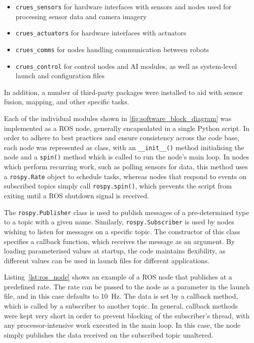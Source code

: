 \begin{itemize}
	\item \verb|crues_sensors| for hardware interfaces with sensors and nodes used
	for processing sensor data and camera imagery
	\item \verb|crues_actuators| for hardware interfaces with actuators
	\item \verb|crues_comms| for nodes handling communication between robots
	\item \verb|crues_control| for control nodes and AI modules, as well as
	system-level launch and configuration files
\end{itemize}

In addition, a number of third-party packages were installed to aid with
sensor fusion, mapping, and other specific tasks.

Each of the individual modules shown in \ref{fig:software_block_diagram} was
implemented as a ROS node, generally encapsulated in a single Python
script. In order to adhere to best practices and ensure consistency across
the code base, each node was represented as class, with an
\verb|__init__()| method initialising the node and a \verb|spin()| method
which is called to run the node's main loop. In nodes which perform
recurring work, such as polling sensors for data, this method uses a
\verb|rospy.Rate| object to schedule tasks, whereas nodes that respond to
events on subscribed topics simply call \verb|rospy.spin()|, which
prevents the script from exiting until a ROS shutdown signal is received.

The \verb|rospy.Publisher| class is used to publish messages of a
pre-determined type to a topic with a given name. Similarly,
\verb|rospy.Subscriber| is used by nodes wishing to listen for messages on
a specific topic. The constructor of this class specifies a callback
function, which receives the message as an argument. By loading parameterised
values at startup, the code maintains flexibility, as different values can
be used in launch files for different applications.

Listing~\ref{lst:ros_node} shows an example of a ROS node that publishes
at a predefined rate. The rate can be passed to the node as a parameter in
the launch file, and in this case defaults to \SI{10}{\Hz}. The data is
set by a callback method, which is called by a subscriber to another
topic. In general, callback methods were kept very short in order to
prevent blocking of the subscriber's thread, with any processor-intensive
work executed in the main loop. In this case, the node simply publishes the
data received on the subscribed topic unaltered.

